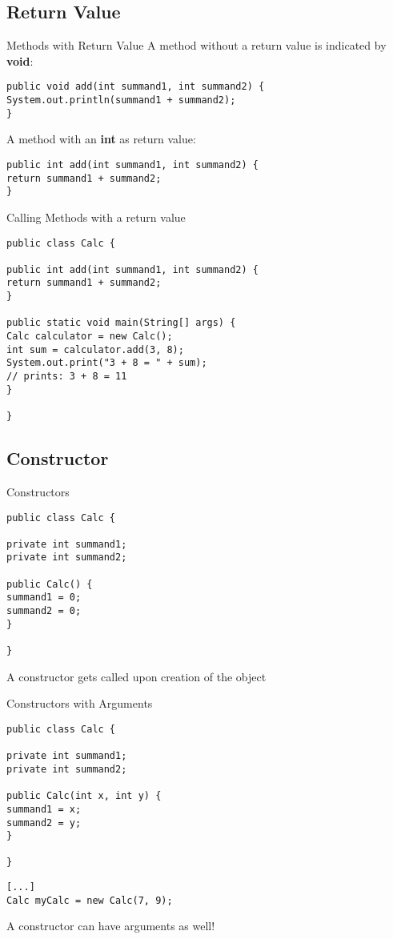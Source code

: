 \subsection{Return Value}
\begin{frame}[fragile]{Methods with Return Value}
A method without a return value is indicated by \textbf{void}:
\begin{lstlisting}
public void add(int summand1, int summand2) {
System.out.println(summand1 + summand2);
}
\end{lstlisting}
A method with an \textbf{int} as return value:
\begin{lstlisting}
public int add(int summand1, int summand2) {
return summand1 + summand2;
}
\end{lstlisting}
\end{frame}

\begin{frame}[fragile]{Calling Methods with a return value}
\begin{lstlisting}
public class Calc {

public int add(int summand1, int summand2) {
return summand1 + summand2;
}

public static void main(String[] args) {
Calc calculator = new Calc();
int sum = calculator.add(3, 8);
System.out.print("3 + 8 = " + sum); 
// prints: 3 + 8 = 11
}

}
\end{lstlisting}
\end{frame}

\subsection{Constructor}

\begin{frame}[fragile]{Constructors}
\begin{lstlisting}
public class Calc {

private int summand1;
private int summand2;

public Calc() {
summand1 = 0;
summand2 = 0;
}

}
\end{lstlisting}
A constructor gets called upon creation of the object
\end{frame}

\begin{frame}[fragile]{Constructors with Arguments}
\begin{lstlisting}
public class Calc {

private int summand1;
private int summand2;

public Calc(int x, int y) {
summand1 = x;
summand2 = y;
}

}
\end{lstlisting}
\begin{lstlisting}
[...]
Calc myCalc = new Calc(7, 9);
\end{lstlisting}

A constructor can have arguments as well!
\end{frame}

